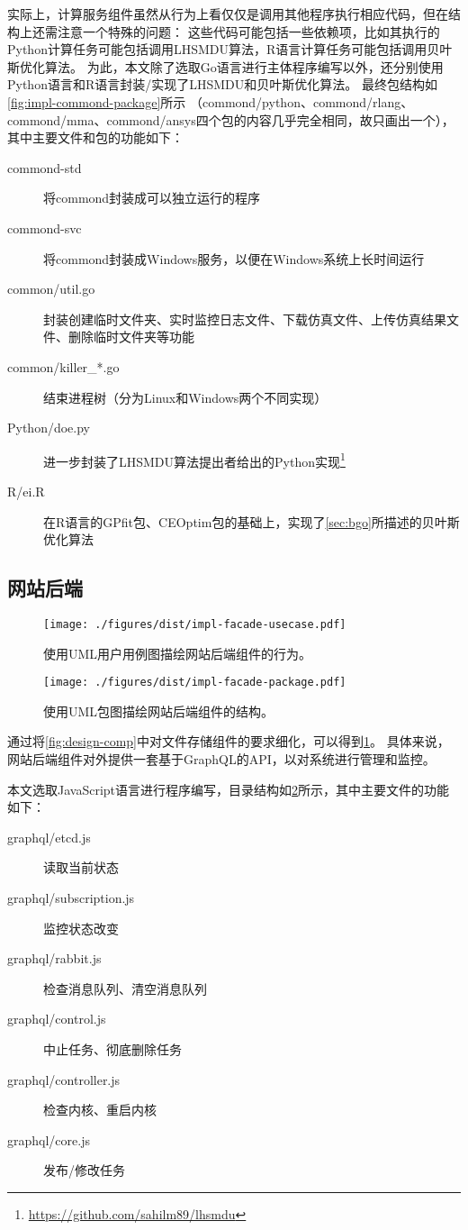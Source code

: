 \documentclass[index]{subfiles}
\begin{document}
实际上，计算服务组件虽然从行为上看仅仅是调用其他程序执行相应代码，但在结构上还需注意一个特殊的问题：
这些代码可能包括一些依赖项，比如其执行的Python计算任务可能包括调用LHSMDU算法，R语言计算任务可能包括调用贝叶斯优化算法。
为此，本文除了选取Go语言进行主体程序编写以外，还分别使用Python语言和R语言封装/实现了LHSMDU和贝叶斯优化算法。
最终包结构如\cref{fig:impl-commond-package}所示
（commond/python、commond/rlang、commond/mma、commond/ansys四个包的内容几乎完全相同，故只画出一个），
其中主要文件和包的功能如下：
\begin{description}
  \item[commond-std] 将commond封装成可以独立运行的程序
  \item[commond-svc] 将commond封装成Windows服务，以便在Windows系统上长时间运行
  \item[common/util.go] 封装创建临时文件夹、实时监控日志文件、下载仿真文件、上传仿真结果文件、删除临时文件夹等功能
  \item[common/killer\_*.go] 结束进程树（分为Linux和Windows两个不同实现）
  \item[Python/doe.py] 进一步封装了LHSMDU算法提出者给出的Python实现\footnote{\href{https://github.com/sahilm89/lhsmdu}{https://github.com/sahilm89/lhsmdu}}
  \item[R/ei.R] 在R语言的GPfit包\cite{macdonald2015}、CEOptim包\cite{benham2015}的基础上，实现了\cref{sec:bgo}所描述的贝叶斯优化算法
\end{description}

\subsection{网站后端}
\begin{figure}[h]
  \centering
  \texttt{[image: ./figures/dist/impl-facade-usecase.pdf]}
  \caption[网站后端组件的行为]{使用UML用户用例图描绘网站后端组件的行为。\label{fig:impl-facade-usecase}}
\end{figure}
\begin{figure}[h]
  \centering
  \texttt{[image: ./figures/dist/impl-facade-package.pdf]}
  \caption[网站后端组件的结构]{使用UML包图描绘网站后端组件的结构。\label{fig:impl-facade-package}}
\end{figure}

通过将\cref{fig:design-comp}中对文件存储组件的要求细化，可以得到\cref{fig:impl-facade-usecase}。
具体来说，网站后端组件对外提供一套基于GraphQL的API，以对系统进行管理和监控。

本文选取JavaScript语言进行程序编写，目录结构如\cref{fig:impl-facade-package}所示，其中主要文件的功能如下：
\begin{description}
  \item[graphql/etcd.js] 读取当前状态
  \item[graphql/subscription.js] 监控状态改变
  \item[graphql/rabbit.js] 检查消息队列、清空消息队列
  \item[graphql/control.js] 中止任务、彻底删除任务
  \item[graphql/controller.js] 检查内核、重启内核
  \item[graphql/core.js] 发布/修改任务
\end{description}
\end{document}
